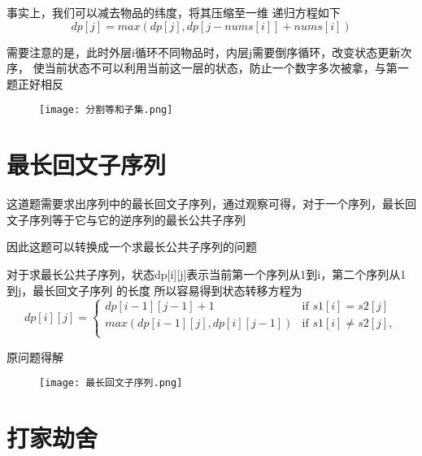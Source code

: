 \documentclass{article}
\begin{document}
事实上，我们可以减去物品的纬度，将其压缩至一维
递归方程如下
\begin{equation}
    dp[j]=max(dp[j],dp[j-nums[i]]+nums[i])
\nonumber
\end{equation}


需要注意的是，此时外层i循环不同物品时，内层j需要倒序循环，改变状态更新次序，
使当前状态不可以利用当前这一层的状态，防止一个数字多次被拿，与第一题正好相反
\begin{figure}[H]
    \begin{flushleft}
    \texttt{[image: 分割等和子集.png]}
    \end{flushleft}
\end{figure}






\newpage


\section{最长回文子序列}
这道题需要求出序列中的最长回文子序列，通过观察可得，对于一个序列，最长回文子序列等于它与它的逆序列的最长公共子序列


因此这题可以转换成一个求最长公共子序列的问题

对于求最长公共子序列，状态dp[i][j]表示当前第一个序列从1到i，第二个序列从1到j，最长回文子序列
的长度
所以容易得到状态转移方程为
\begin{equation}
dp[i][j] = \begin{cases}
dp[i-1][j-1]+1 & \text{if }  s1[i]=s2[j]\\
max(dp[i-1][j],dp[i][j-1]) & \text{if } s1[i] \neq s2[j],\\

\end{cases}
\nonumber
\end{equation}

原问题得解

\begin{figure}[H]
    \begin{flushleft}
    \texttt{[image: 最长回文子序列.png]}
  \end{flushleft}
\end{figure}
\newpage
\section{打家劫舍}
\end{document}
